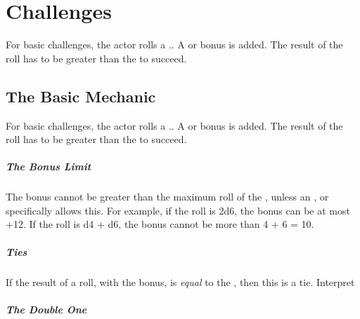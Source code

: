 \documentclass{LegrandOrangeTufteBook}
\begin{document}
\chapterspaceabove{6.75cm}
\chapterspacebelow{11.25cm}


\chapter*{Challenges}

\begin{emphasisParagraph}
	For basic challenges, the actor rolls a ..
	A  or  bonus is added.
	The result of the roll has to be greater than the  to succeed.
\end{emphasisParagraph}

\section*{The Basic Mechanic}
For basic challenges, the actor rolls a ..
A  or  bonus is added.
The result of the roll has to be greater than the  to succeed.\\

\paragraph*{The Bonus Limit}
The bonus cannot be greater than the maximum roll of the ,
unless an ,  or  specifically allows this.
For example, if the roll is 2d6, the bonus can be at most +12. If the roll is d4 + d6,
the bonus cannot be more than 4 + 6 = 10.\\

\paragraph*{Ties}
If the result of a roll, with the bonus, is \emph{equal} to the \acronymDL,
then this is a tie. Interpret

\paragraph*{The Double One}
\end{document}
